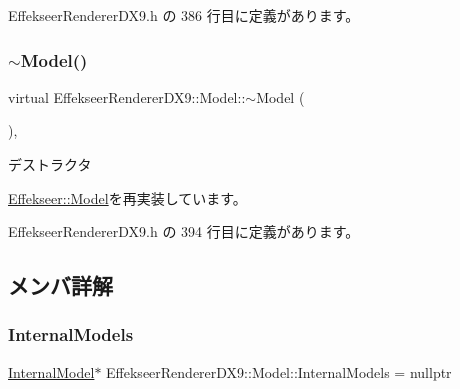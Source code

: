  Effekseer\+Renderer\+D\+X9.\+h の 386 行目に定義があります。

\mbox{\label{class_effekseer_renderer_d_x9_1_1_model_a5878dbe0a5971ffb28d6c1af347c6e87}} 
\subsubsection{\texorpdfstring{$\sim$\+Model()}{~Model()}}
{\footnotesize\ttfamily virtual Effekseer\+Renderer\+D\+X9\+::\+Model\+::$\sim$\+Model (\begin{DoxyParamCaption}{ }\end{DoxyParamCaption})\hspace{0.3cm}{\ttfamily [inline]}, {\ttfamily [virtual]}}



デストラクタ 



\mbox{\hyperlink{class_effekseer_1_1_model_a02266837426d39149d3eb56da7051c98}{Effekseer\+::\+Model}}を再実装しています。



 Effekseer\+Renderer\+D\+X9.\+h の 394 行目に定義があります。



\subsection{メンバ詳解}
\mbox{\label{class_effekseer_renderer_d_x9_1_1_model_a712d95cfe8c2223a708038c7132e60f5}} 
\subsubsection{\texorpdfstring{Internal\+Models}{InternalModels}}
{\footnotesize\ttfamily \mbox{\hyperlink{struct_effekseer_renderer_d_x9_1_1_model_1_1_internal_model}{Internal\+Model}}$\ast$ Effekseer\+Renderer\+D\+X9\+::\+Model\+::\+Internal\+Models = nullptr}



